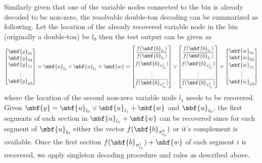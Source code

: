 \documentclass[conference,,twocolumn]{IEEEtran}
\begin{document}
Similarly given that one of the variable nodes connected to the bin is already decoded to be non-zero, the resolvable double-ton decoding can be summarized as following. Let the location of the already recovered variable node in the bin (originally a double-ton) be $l_0$ then the test output can be given as 
\begin{align*}
\begin{bmatrix}
\mbf{y}_{01}\\
\mbf{y}_{02}\\
\mbf{y}_{11}\\
\vdots \\
\mbf{y}_{p2}\\
\end{bmatrix}
=\mbf{u}_{l_0} \vee \mbf{u}_{l_1}+\mbf{w}=
\begin{bmatrix}
f(\mbf{b}_{l_0})\\
\vspace{2pt}
\overline{f(\mbf{b}_{l_0})}\\
f(\mbf{b}_{\pi^1_{l_0}})\\
\vdots \\
\overline{f(\mbf{b}_{\pi^p_{l_0}})}\\
\end{bmatrix} 
\vee
\begin{bmatrix}
f(\mbf{b}_{l_1})\\
\vspace{2pt}
\overline{f(\mbf{b}_{l_1})}\\
f(\mbf{b}_{\pi^1_{l_1}})\\
\vdots \\
\overline{f(\mbf{b}_{\pi^p_{l_1}})}\\
\end{bmatrix}+
\begin{bmatrix}
\mbf{w}_{01}\\
\vspace{2pt}
\mbf{w}_{02}\\
\mbf{w}_{11}\\
\vdots \\
\mbf{w}_{p2}\\
\end{bmatrix}
\end{align*} 
where the location of the second non-zero variable node $l_1$ needs to be recovered. Given $\mbf{y}=\mbf{u}_{l_0} \vee \mbf{u}_{l_1}+\mbf{w}$ and $\mbf{u}_{l_0}$, the first segments of each section in $\mbf{u}_{l_1}+\mbf{w}$ can be recovered since for each segment of $\mbf{u}_{l_0}$ either the vector $f(\mbf{b}_{\pi^k_{l_0}})$ or it's complement is available. Once the first section $f(\mbf{b}_{\pi_{l_1}^i})+\mbf{w}$ of each segment $i$ is recovered, we apply singleton decoding procedure and rules as described above.
\end{document}
